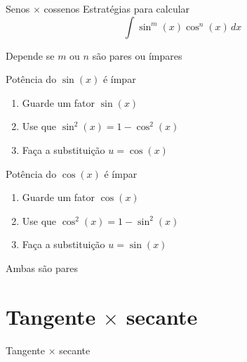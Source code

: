 \begin{frame}{Senos $\times$ cossenos}
  Estratégias para calcular
  \[
    \int \sin^m(x) \cos^n(x)\,dx
  \]

  Depende se $m$ ou $n$ são pares ou ímpares
\end{frame}

\begin{frame}{Potência do $\sin(x)$ é ímpar}
  \begin{enumerate}[<+->]
    \setlength\itemsep{1em}
    \item Guarde um fator $\sin(x)$
    \item Use que $\sin^2(x) = 1 - \cos^2(x)$
    \item Faça a substituição $u=\cos(x)$
  \end{enumerate}
\end{frame}

\begin{frame}{Potência do $\cos(x)$ é ímpar}
  \begin{enumerate}[<+->]
    \setlength\itemsep{1em}
    \item Guarde um fator $\cos(x)$
    \item Use que $\cos^2(x) = 1 - \sin^2(x)$
    \item Faça a substituição $u=\sin(x)$
  \end{enumerate}
\end{frame}

\begin{frame}{Ambas são pares}

\end{frame}

\section{Tangente $\times$ secante}

\begin{frame}{Tangente $\times$ secante}

\end{frame}

